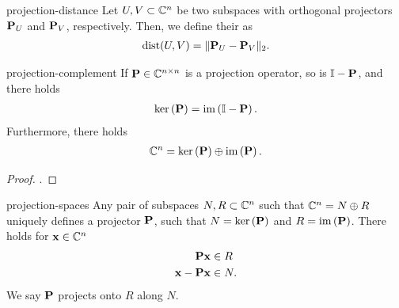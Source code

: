 \begin{Definition}{projection-distance}
  Let $U,V\subset \mathbb C^n$ be two subspaces with orthogonal projectors
  $\mathbf P_U$ and $\mathbf P_V$, respectively. Then, we define their
   as
  \begin{gather}
    \operatorname{dist}(U,V) = \lVert\mathbf P_U-\mathbf P_V\rVert_2.
  \end{gather}
\end{Definition}



\begin{Lemma}{projection-complement}
  If $\mathbf P\in\mathbb C^{n\times n}$ is a projection operator, so is
  $\mathbb I-\mathbf P$, and there holds
  \begin{gather}
    \operatorname{ker}\left(\mathbf P\right) = \operatorname{im}\left(\mathbb I-\mathbf P\right).
  \end{gather}
  Furthermore, there holds
  \begin{gather}
    \mathbb C^n = \operatorname{ker}\left(\mathbf P\right) \oplus \operatorname{im}\left(\mathbf P\right).
  \end{gather}
\end{Lemma}

\begin{proof}
  \cite[Section 1.12.1]{Saad00}.
\end{proof}

\begin{Lemma}{projection-spaces}
  Any pair of subspaces $N,R\subset \mathbb C^n$ such that $\mathbb C^n = N\oplus R$
  uniquely defines a projector $\mathbf P$, such that $N = \operatorname{ker}\left(\mathbf P\right)$ and
  $R=\operatorname{im}\left(\mathbf P\right)$. There holds for $\mathbf x\in\mathbb C^n$
  \begin{align}
    \mathbf P \mathbf x &\in R\\
    \mathbf x - \mathbf P \mathbf x &\in N.
  \end{align}
  We say $\mathbf P$ projects onto $R$ along $N$.
\end{Lemma}

